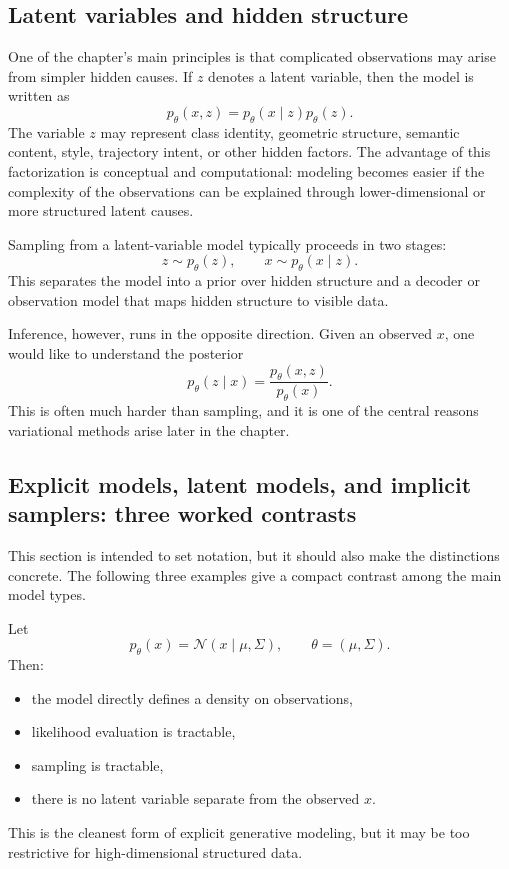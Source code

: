 \subsection*{Latent variables and hidden structure}

One of the chapter's main principles is that complicated observations may arise from simpler hidden causes.
If $z$ denotes a latent variable, then the model is written as
\[
p_\theta(x,z)=p_\theta(x\mid z)p_\theta(z).
\]
The variable $z$ may represent class identity, geometric structure, semantic content, style, trajectory intent, or other hidden factors.
The advantage of this factorization is conceptual and computational:
modeling becomes easier if the complexity of the observations can be explained through lower-dimensional or more structured latent causes.

\medskip

\noindent
Sampling from a latent-variable model typically proceeds in two stages:
\[
z \sim p_\theta(z),
\qquad
x \sim p_\theta(x\mid z).
\]
This separates the model into a prior over hidden structure and a decoder or observation model that maps hidden structure to visible data.

\medskip

\noindent
Inference, however, runs in the opposite direction.
Given an observed $x$, one would like to understand the posterior
\[
p_\theta(z\mid x)=\frac{p_\theta(x,z)}{p_\theta(x)}.
\]
This is often much harder than sampling, and it is one of the central reasons variational methods arise later in the chapter.

\subsection*{Explicit models, latent models, and implicit samplers: three worked contrasts}

This section is intended to set notation, but it should also make the distinctions concrete.
The following three examples give a compact contrast among the main model types.

\begin{example}
Let
\[
p_\theta(x)=\mathcal{N}(x\mid \mu,\Sigma),
\qquad
\theta=(\mu,\Sigma).
\]
Then:
\begin{itemize}
    \item the model directly defines a density on observations,
    \item likelihood evaluation is tractable,
    \item sampling is tractable,
    \item there is no latent variable separate from the observed $x$.
\end{itemize}
This is the cleanest form of explicit generative modeling, but it may be too restrictive for high-dimensional structured data.
\end{example}

